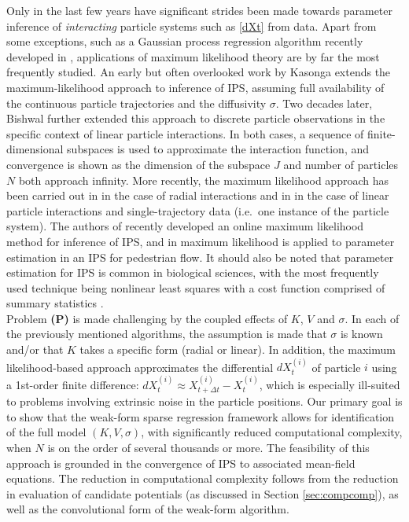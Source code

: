 \documentclass[english,reqno]{amsart}
\begin{document}
Only in the last few years have significant strides been made towards parameter inference of {\it interacting} particle systems such as \eqref{dXt} from data. Apart from some exceptions, such as a Gaussian process regression algorithm recently developed in \cite{feng2021data}, applications of maximum likelihood theory are by far the most frequently studied. An early but often overlooked work by Kasonga \cite{kasonga1990maximum} extends the maximum-likelihood approach to inference of IPS, assuming full availability of the continuous particle trajectories and the diffusivity $\sigma$. Two decades later, Bishwal \cite{bishwal2011estimation} further extended this approach to discrete particle observations in the specific context of linear particle interactions. In both cases, a sequence of finite-dimensional subspaces is used to approximate the interaction function, and convergence is shown as the dimension of the subspace $J$ and number of particles $N$ both approach infinity. More recently, the maximum likelihood approach has been carried out in \cite{bongini2017inferring,lu2020learning} in the case of radial interactions and in \cite{chen2021maximum} in the case of linear particle interactions and single-trajectory data (i.e.\ one instance of the particle system). The authors of \cite{sharrock2021parameter} recently developed an online maximum likelihood method for inference of IPS, and in \cite{gomes2019parameter} maximum likelihood is applied to parameter estimation in an IPS for pedestrian flow. It should also be noted that parameter estimation for IPS is common in biological sciences, with the most frequently used technique being nonlinear least squares with a cost function comprised of summary statistics \cite{lukeman2010inferring,sepulveda2013collective}.\\ 

Problem \textbf{(P)} is made challenging by the coupled effects of $K$, $V$ and $\sigma$. In each of the previously mentioned algorithms, the assumption is made that $\sigma$ is known and/or that $K$ takes a specific form (radial or linear). In addition, the maximum likelihood-based approach approximates the differential $dX_t^{(i)}$ of particle $i$ using a 1st-order finite difference: $dX_t^{(i)} \approx X_{t+\Delta t}^{(i)} - X_t^{(i)}$, which is especially ill-suited to problems involving extrinsic noise in the particle positions. Our primary goal is to show that the weak-form sparse regression framework allows for identification of the full model $(K,V,\sigma)$, with significantly reduced computational complexity, when $N$ is on the order of several thousands or more. The feasibility of this approach is grounded in the convergence of IPS to associated mean-field equations. The reduction in computational complexity follows from the reduction in evaluation of candidate potentials (as discussed in Section \ref{sec:compcomp}), as well as the convolutional form of the weak-form algorithm.\\
\end{document}
